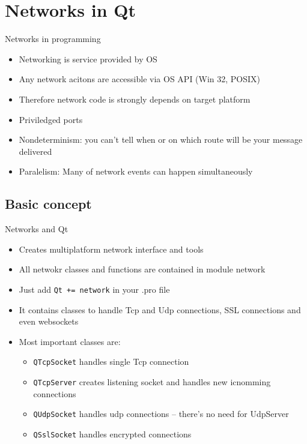 \documentclass{beamer}
\begin{document}
    \section{Networks in Qt}
    \begin{frame}{Networks in programming}
        \begin{itemize}
            \item Networking is service provided by OS
            \item Any network acitons are accessible via OS API (Win 32, POSIX)
            \item Therefore network code is strongly depends on target platform
            \item Priviledged ports
            \item Nondeterminism: you can't tell when or on which route will be your message delivered
            \item Paralelism: Many of network events can happen simultaneously
        \end{itemize}
    \end{frame}
    \subsection{Basic concept}
    \begin{frame}[allowframebreaks]{Networks and Qt}
        \begin{itemize}
            \item Creates multiplatform network interface and tools
            \item All netwokr classes and functions are contained in module network
            \item Just add \texttt{Qt += network} in your .pro file
            \item It contains classes to handle Tcp and Udp connections, SSL connections and
            even websockets
            \framebreak
            \item Most important classes are:
            \begin{itemize}
                \item \texttt{QTcpSocket} handles single Tcp connection
                \item \texttt{QTcpServer} creates listening socket and handles new icnomming connections
                \item \texttt{QUdpSocket} handles udp connections -- there's no need for UdpServer
                \item \texttt{QSslSocket} handles encrypted connections
            \end{itemize}
        \end{itemize}
    \end{frame}
\end{document}
